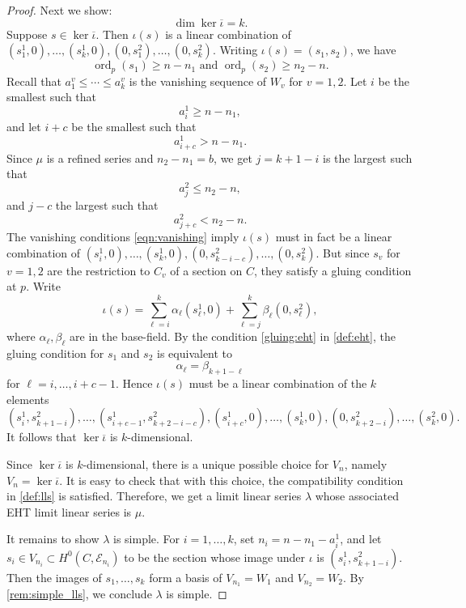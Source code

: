 \documentclass[11pt,reqno]{amsart}
\theoremstyle{plain}
\theoremstyle{definition}
\theoremstyle{remark}
\numberwithin{equation}{section}
\numberwithin{equation}{section}
\DeclareMathOperator{\ord}{ord}
\begin{document}
\begin{proof}
  Next we show:
  \begin{equation}\label{eqn:keriotabar}
    \dim \ker \overline \iota = k.
  \end{equation}
  Suppose $s \in \ker\overline\iota$.
  Then $\iota(s)$ is a linear combination of $(s^1_1,0), \dots, (s^1_k,0), (0,s^2_1), \dots, (0,s^2_k)$.
  Writing $\iota(s) = (s_1, s_2)$, we have
  \begin{equation}\label{eqn:vanishing}
    \ord_p (s_1) \geq n-n_1 \text{ and } \ord_p(s_2) \geq n_2-n.
  \end{equation}
  Recall that $a^v_1 \leq \cdots \leq a^v_k$ is the vanishing sequence of $W_v$ for $v = 1, 2$.
  Let $i$ be the smallest such that
  \[ a^1_{i} \geq n - n_1,\]
  and let $i + c$ be the smallest such that
  \[ a^1_{i + c} > n - n_1.\]
  Since $\mu$ is a refined series and $n_2 - n_1 = b$, we get $j = k+1-i$ is the largest such that
  \[ a^2_j \leq n_2 - n,\]
  and $j - c$ the largest such that
  \[ a^2_{j + c } < n_2 - n.\]
  The vanishing conditions \eqref{eqn:vanishing} imply $\iota(s)$ must in fact be a linear combination of $(s^1_i,0), \dots, (s^1_k,0), (0,s^2_{k-i-c}), \dots, (0,s^2_k)$.
  But since $s_v$ for $v = 1, 2$ are the restriction to $C_v$ of a section on $C$, they satisfy a gluing condition at $p$.
  Write
  \[ \iota(s) = \sum_{\ell = i}^k \alpha_{\ell} (s^1_\ell,0) + \sum_{\ell = j}^{k} \beta_\ell (0,s^2_\ell),\]
  where $\alpha_\ell, \beta_\ell$ are in the base-field.
  By the condition \eqref{gluing:eht} in \autoref{def:eht}, the gluing condition for $s_1$ and $s_2$ is equivalent to
  \[ \alpha_{\ell} = \beta_{k+1-\ell}\]
  for $\ell = i, \dots, i+c-1$.
  Hence $\iota(s)$ must be a linear combination of the $k$ elements
  \[ (s^1_i , s^2_{k+1-i}), \dots, (s^1_{i+c-1} , s^2_{k+2-i-c}), (s^1_{i+c},0), \dots, (s^1_k,0), (0,s^2_{k+2-i}), \dots, (s^2_{k},0).\]
  It follows that $\ker \overline\iota$ is $k$-dimensional.

  Since $\ker \overline \iota$ is $k$-dimensional, there is a unique possible choice for $V_n$, namely $V_n = \ker \overline \iota$.
  It is easy to check that with this choice, the compatibility condition in \autoref{def:lls} is satisfied.
  Therefore, we get a limit linear series $\lambda$ whose associated EHT limit linear series is $\mu$.

  It remains to show $\lambda$ is simple.
  For $i = 1, \dots, k$, set $n_i = n-n_1-a^1_i$, and let $s_i \in V_{n_i} \subset H^0(C, \mathcal E_{n_i})$ to be the section whose image under $\iota$ is $(s^1_i , s^2_{k+1-i})$.
  Then the images of $s_1, \dots, s_k$ form a basis of $V_{n_1} = W_1$ and $V_{n_2} = W_2$.
  By \autoref{rem:simple_lls}, we conclude $\lambda$ is simple.
\end{proof}
\end{document}
